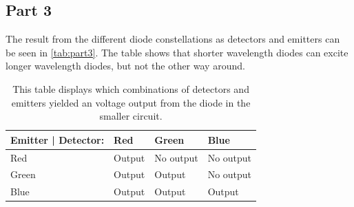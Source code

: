 \subsection{Part 3}
The result from the different diode constellations as detectors and emitters can be seen in \autoref{tab:part3}. The table shows that shorter wavelength diodes can excite longer wavelength diodes, but not the other way around.

\begin{table}[H]
    \centering
    \caption{This table displays which combinations of detectors and emitters yielded an voltage output from the diode in the smaller circuit.}
    \begin{tabular}{@{}llll@{}}
    \toprule
    Emitter | Detector: & Red    & Green     & Blue      \\ \midrule
    Red              & Output & No output & No output \\
    Green            & Output & Output    & No output \\
    Blue             & Output & Output    & Output    \\ \bottomrule
    \end{tabular}
    \label{tab:part3}
\end{table}